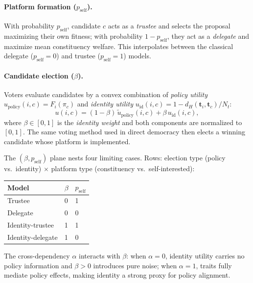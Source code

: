 \paragraph{Platform formation ($p_{\mathrm{self}}$).}
With probability $p_{\mathrm{self}}$, candidate $c$ acts as a \emph{trustee}
and selects the proposal maximizing their own fitness; with probability
$1 - p_{\mathrm{self}}$, they act as a \emph{delegate} and maximize mean
constituency welfare. This interpolates between the classical delegate
($p_{\mathrm{self}}=0$) and trustee ($p_{\mathrm{self}}=1$) models.

\paragraph{Candidate election ($\beta$).}
Voters evaluate candidates by a convex combination of \emph{policy utility}
$u_{\mathrm{policy}}(i,c) = F_i(\pi_c)$ and \emph{identity utility}
$u_{\mathrm{id}}(i,c) = 1 - d_H(\mathbf{t}_i, \mathbf{t}_c)/N_t$:
\begin{equation}
  u(i, c) = (1-\beta)\,\tilde{u}_{\mathrm{policy}}(i, c)
           + \beta\,u_{\mathrm{id}}(i, c),
\end{equation}
where $\beta \in [0,1]$ is the \emph{identity weight} and both components are
normalized to $[0,1]$. The same voting method used in direct democracy then
elects a winning candidate whose platform is implemented.

The $(\beta, p_{\mathrm{self}})$ plane nests four limiting cases.
Rows: election type (policy vs.\ identity) $\times$ platform type
(constituency vs.\ self-interested):

\begin{center}
\begin{tabular}{lll}
\toprule
Model & $\beta$ & $p_{\mathrm{self}}$ \\
\midrule
Trustee        & 0 & 1 \\
Delegate       & 0 & 0 \\
Identity-trustee  & 1 & 1 \\
Identity-delegate & 1 & 0 \\
\bottomrule
\end{tabular}
\end{center}

The cross-dependency $\alpha$ interacts with $\beta$: when $\alpha=0$, identity
utility carries no policy information and $\beta > 0$ introduces pure noise;
when $\alpha=1$, traits fully mediate policy effects, making identity a strong
proxy for policy alignment.

